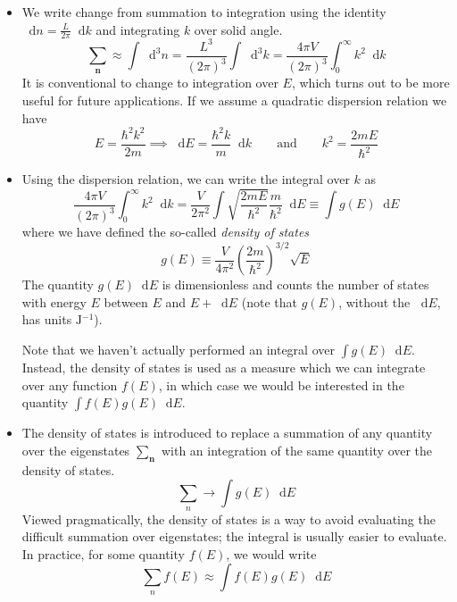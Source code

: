 \documentclass[11pt, a4paper]{article}
\newcommand{\diff}{\mathop{}\!\mathrm{d}} %
\begin{document}
\begin{itemize}
	\item We write change from summation to integration using the identity $ \diff n = \frac{L}{2\pi} \diff k $ and integrating $ k $ over solid angle.
	\begin{equation*}
		\sum_{\bm{n}} \approx \int \diff^{3}n = \frac{L^{3}}{(2\pi)^{3}}\int \diff^{3} k = \frac{4\pi V}{(2\pi)^{3}}\int_{0}^{\infty}k^{2} \diff k
	\end{equation*}
	It is conventional to change to integration over $ E $, which turns out to be more useful for future applications. If we assume a quadratic dispersion relation we have
	\begin{equation*}
		E = \frac{\hbar^{2}k^{2}}{2m} \implies \diff E = \frac{\hbar^{2}k}{m}\diff k \qquad \text{and} \qquad k^{2} = \frac{2mE}{\hbar^{2}}
	\end{equation*}
	
	\item Using the dispersion relation, we can write the integral over $ k $ as
	\begin{equation*}
		\frac{4\pi V}{(2\pi)^{3}}\int_{0}^{\infty}k^{2} \diff k = \frac{V}{2\pi^{2}} \int \sqrt{\frac{2mE}{\hbar^{2}}} \frac{m}{\hbar^{2}} \diff E \equiv \int g(E) \diff E
	\end{equation*}
	where we have defined the so-called \textit{density of states}
	\begin{equation*}
		g(E) \equiv \frac{V}{4\pi^{2}} \left(\frac{2m}{\hbar^{2}}\right)^{3/2} \sqrt{E}
	\end{equation*}
	The quantity $ g(E)\diff E $ is dimensionless and counts the number of states with energy $ E $ between $ E $ and $ E + \diff E $ (note that $ g(E) $, without the $ \diff E $, has units $ \si{\joule^{-1}} $). 	
	
	Note that we haven't actually performed an integral over $ \int g(E) \diff E $. Instead, the density of states is used as a measure which we can integrate over any function $ f(E) $, in which case we would be interested in the quantity $ \int f(E) g(E) \diff E $. 
	
	\item The density of states is introduced to replace a summation of any quantity over the eigenstates $ \sum_{\bm{n}} $ with an integration of the same quantity over the density of states. 
	\begin{equation*}
		\sum_{n} \to \int g(E) \diff E 
	\end{equation*}
	Viewed pragmatically, the density of states is a way to avoid evaluating the difficult summation over eigenstates; the integral is usually easier to evaluate. In practice, for some quantity $ f(E) $, we would write
	\begin{equation*}
		\sum_{n} f(E) \approx \int f(E) g(E) \diff E 
	\end{equation*}


\end{itemize}
\end{document}
